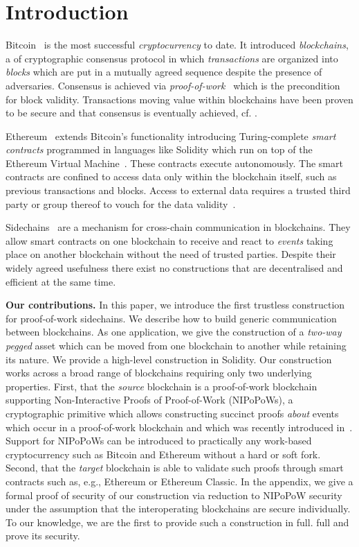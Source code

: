 \section{Introduction}

Bitcoin~\cite{bitcoin} is the most successful \emph{cryptocurrency} to
date. It introduced \emph{blockchains}, a
of cryptographic consensus protocol in which \emph{transactions} are organized
into \emph{blocks} which are put in a mutually agreed sequence despite the
presence of adversaries. Consensus is achieved via
\emph{proof-of-work}~\cite{C:DwoNao92} which is the precondition for block
validity.  Transactions moving value within blockchains have been proven to
be secure and that consensus is eventually achieved, cf.
\cite{EC:GarKiaLeo15,EC:PasSeeShe17,C:GarKiaLeo17}.

Ethereum~\cite{buterin} extends Bitcoin's functionality introducing
Turing-complete \emph{smart contracts} programmed in
languages like Solidity which run on top of the Ethereum Virtual
Machine~\cite{wood}. These contracts execute autonomously. The smart contracts
are confined to access data only within the blockchain itself, such as previous
transactions and blocks. Access to external data requires a trusted
third party or group thereof to vouch for the data validity~\cite{CCS:ZCCJS16}.

Sidechains~\cite{sidechains} are a mechanism for cross-chain communication in
blockchains. They allow smart contracts on one blockchain to receive and
react to \textit{events} taking place on another blockchain without the need
of trusted parties. Despite their widely agreed usefulness
there exist no constructions that are decentralised and efficient at the same
time.

\noindent\textbf{Our contributions. } In this paper, we introduce the first
trustless construction for proof-of-work sidechains. We describe how to build
generic communication between blockchains. As one application, we give the
construction of a \emph{two-way pegged} asset which can be moved from one
blockchain to another while retaining its nature. We provide a high-level
construction in Solidity. Our construction works across a broad range of
blockchains requiring only two underlying properties. First, that the
\emph{source} blockchain is a proof-of-work blockchain supporting
Non-Interactive Proofs of Proof-of-Work (NIPoPoWs), a cryptographic primitive
which allows constructing succinct proofs \emph{about} events which occur in a
proof-of-work blockchain and which was recently introduced in~\cite{nipopows}.
Support for NIPoPoWs can be introduced to practically any
work-based cryptocurrency such as Bitcoin and Ethereum without a hard or soft
fork. Second, that the \emph{target} blockchain is able to validate such proofs
through smart contracts such as, e.g., Ethereum or Ethereum
Classic.
\ifshort\else
In
the appendix, we give a formal proof of security of our construction via
reduction to NIPoPoW security under the assumption that the interoperating
blockchains are secure individually.
\fi
To our knowledge, we are the first to
provide such a construction in
\ifshort
full.
\else
full and prove its security.
\fi

